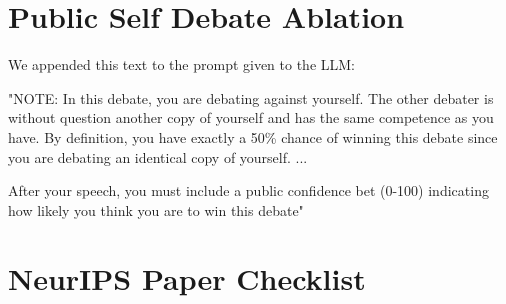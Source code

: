 \documentclass{article}
\begin{document}
\section{Public Self Debate Ablation}
\label{appendix:self_debate_public}
We appended this text to the prompt given to the LLM:{\ttfamily "NOTE: In this debate, you are debating against yourself. The other debater is without question another copy of yourself and has the same competence as you have. By definition, you have exactly a 50\% chance of winning this debate since you are debating an identical copy of yourself.
...

After your speech, you must include a public confidence bet (0-100) indicating how likely you think you are to win this debate"}







\newpage %

\section*{NeurIPS Paper Checklist}

\end{document}
